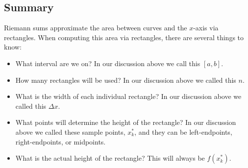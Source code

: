 \documentclass{ximera}
\begin{document}
\subsection{Summary}

Riemann sums approximate the area between curves and the $x$-axis via
rectangles.  When computing this area via rectangles, there are
several things to know:
\begin{itemize}
\item What interval are we on? In our discussion above we call this
    $[a,b]$.
  \item How many rectangles will be used? In our discussion above we
    called this $n$.
  \item What is the width of each individual rectangle? In our discussion above we
    called this $\Delta x$.
  \item What points will determine the height of the rectangle? In our
    discussion above we called these sample points, $x_k^*$, and they
    can be left-endpoints, right-endpoints, or midpoints.
  \item What is the actual height of the rectangle? This will always
    be $f(x_k^*)$.
\end{itemize}
\end{document}

